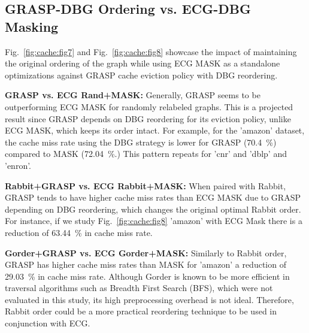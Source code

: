 \documentclass[conference]{IEEEtran}
\begin{document}
\subsection{GRASP-DBG Ordering vs. ECG-DBG Masking}
Fig.~\ref{fig:cache:fig7} and Fig.~\ref{fig:cache:fig8} showcase the impact of maintaining the original ordering of the graph while using ECG MASK as a standalone optimizations against GRASP cache eviction policy with DBG reordering.

\textbf{GRASP vs. ECG Rand+MASK:} Generally, GRASP seems to be outperforming ECG MASK for randomly relabeled graphs. This is a projected result since GRASP depends on DBG reordering for its eviction policy, unlike ECG MASK, which keeps its order intact. For example, for the 'amazon' dataset, the cache miss rate using the DBG strategy is lower for GRASP (\SI{70.4}{\percent}) compared to MASK (\SI{72.04}{\percent}.) This pattern repeats for 'cnr'  and 'dblp' and 'enron'.

\textbf{Rabbit+GRASP vs. ECG Rabbit+MASK:} When paired with Rabbit, GRASP tends to have higher cache miss rates than ECG MASK due to GRASP depending on DBG reordering, which changes the original optimal Rabbit order. For instance, if we study Fig.~\ref{fig:cache:fig8} 'amazon' with ECG Mask there is a reduction of \SI{63.44}{\percent} in cache miss rate.

\textbf{Gorder+GRASP vs. ECG Gorder+MASK:} Similarly to Rabbit order, GRASP has higher cache miss rates than MASK for 'amazon' a reduction of \SI{29.03}{\percent} in cache miss rate. Although Gorder is known to be more efficient in traversal algorithms such as Breadth First Search (BFS), which were not evaluated in this study, its high preprocessing overhead is not ideal. Therefore, Rabbit order could be a more practical reordering technique to be used in conjunction with ECG.


\end{document}
